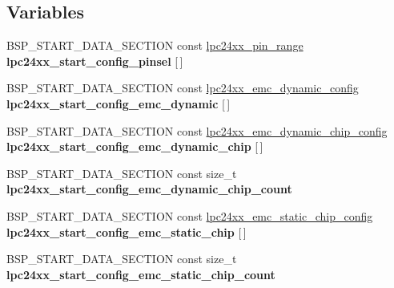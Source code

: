 \subsection*{Variables}
\begin{DoxyCompactItemize}
\item 
\mbox{\label{start-config_8h_ac451140de50a4c6306d396e1c5a154ef}} 
B\+S\+P\+\_\+\+S\+T\+A\+R\+T\+\_\+\+D\+A\+T\+A\+\_\+\+S\+E\+C\+T\+I\+ON const \mbox{\hyperlink{unionlpc24xx__pin__range}{lpc24xx\+\_\+pin\+\_\+range}} {\bfseries lpc24xx\+\_\+start\+\_\+config\+\_\+pinsel} \mbox{[}$\,$\mbox{]}
\item 
\mbox{\label{start-config_8h_a95181910c97e800c3d8d3b2485aad8fb}} 
B\+S\+P\+\_\+\+S\+T\+A\+R\+T\+\_\+\+D\+A\+T\+A\+\_\+\+S\+E\+C\+T\+I\+ON const \mbox{\hyperlink{structlpc24xx__emc__dynamic__config}{lpc24xx\+\_\+emc\+\_\+dynamic\+\_\+config}} {\bfseries lpc24xx\+\_\+start\+\_\+config\+\_\+emc\+\_\+dynamic} \mbox{[}$\,$\mbox{]}
\item 
\mbox{\label{start-config_8h_a60954433c1d7b0c615e44aee4bad48ee}} 
B\+S\+P\+\_\+\+S\+T\+A\+R\+T\+\_\+\+D\+A\+T\+A\+\_\+\+S\+E\+C\+T\+I\+ON const \mbox{\hyperlink{structlpc24xx__emc__dynamic__chip__config}{lpc24xx\+\_\+emc\+\_\+dynamic\+\_\+chip\+\_\+config}} {\bfseries lpc24xx\+\_\+start\+\_\+config\+\_\+emc\+\_\+dynamic\+\_\+chip} \mbox{[}$\,$\mbox{]}
\item 
\mbox{\label{start-config_8h_a11976802663bb761627fdbb45f755603}} 
B\+S\+P\+\_\+\+S\+T\+A\+R\+T\+\_\+\+D\+A\+T\+A\+\_\+\+S\+E\+C\+T\+I\+ON const size\+\_\+t {\bfseries lpc24xx\+\_\+start\+\_\+config\+\_\+emc\+\_\+dynamic\+\_\+chip\+\_\+count}
\item 
\mbox{\label{start-config_8h_ab4cfd56aefc76a77e47abe841a9b661f}} 
B\+S\+P\+\_\+\+S\+T\+A\+R\+T\+\_\+\+D\+A\+T\+A\+\_\+\+S\+E\+C\+T\+I\+ON const \mbox{\hyperlink{structlpc24xx__emc__static__chip__config}{lpc24xx\+\_\+emc\+\_\+static\+\_\+chip\+\_\+config}} {\bfseries lpc24xx\+\_\+start\+\_\+config\+\_\+emc\+\_\+static\+\_\+chip} \mbox{[}$\,$\mbox{]}
\item 
\mbox{\label{start-config_8h_ae5edd159c1f32543b939bef7cf07c8ee}} 
B\+S\+P\+\_\+\+S\+T\+A\+R\+T\+\_\+\+D\+A\+T\+A\+\_\+\+S\+E\+C\+T\+I\+ON const size\+\_\+t {\bfseries lpc24xx\+\_\+start\+\_\+config\+\_\+emc\+\_\+static\+\_\+chip\+\_\+count}
\end{DoxyCompactItemize}


